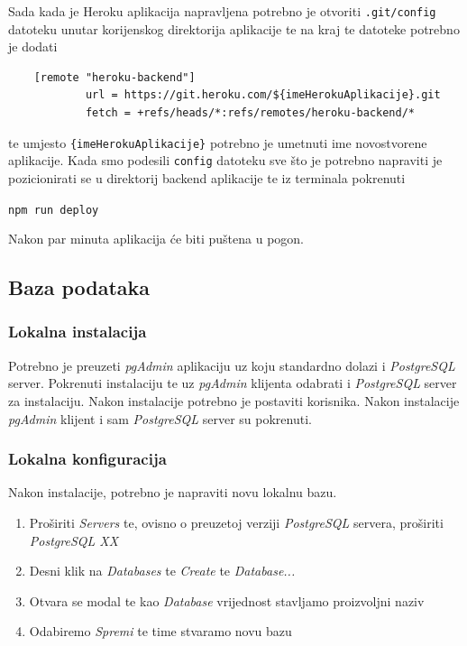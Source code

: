 		        		Sada kada je Heroku aplikacija napravljena potrebno je otvoriti \texttt{.git/config} datoteku unutar korijenskog direktorija aplikacije te na kraj te datoteke potrebno je dodati

                \begin{verbatim}
    [remote "heroku-backend"]
        	url = https://git.heroku.com/${imeHerokuAplikacije}.git
        	fetch = +refs/heads/*:refs/remotes/heroku-backend/*
								\end{verbatim}
								
								te umjesto \texttt{\{imeHerokuAplikacije\}} potrebno je umetnuti ime novostvorene aplikacije. Kada smo podesili \texttt{config} datoteku sve što je potrebno napraviti je pozicionirati se u direktorij backend aplikacije te iz terminala pokrenuti 

								\begin{center}
										\texttt{npm run deploy}
								\end{center}
								
								Nakon par minuta aplikacija će biti puštena u pogon.
						
						\pagebreak
		    
				\subsection{Baza podataka}
			
						\subsubsection*{Lokalna instalacija}
						
								Potrebno je preuzeti \textit{pgAdmin} aplikaciju uz koju standardno dolazi i \textit{PostgreSQL} server. Pokrenuti instalaciju te uz \textit{pgAdmin} klijenta odabrati i \textit{PostgreSQL} server za instalaciju. Nakon instalacije potrebno je postaviti korisnika. Nakon instalacije \textit{pgAdmin} klijent i sam \textit{PostgreSQL} server su pokrenuti.
								
						\subsubsection*{Lokalna konfiguracija}
								
								Nakon instalacije, potrebno je napraviti novu lokalnu bazu.
								
								\begin{enumerate}
										\item Proširiti \textit{Servers} te, ovisno o preuzetoj verziji \textit{PostgreSQL} servera, proširiti  \textit{PostgreSQL XX}
										\item Desni klik na \textit{Databases} te \textit{Create} te \textit{Database...}
										\item Otvara se modal te kao \textit{Database} vrijednost stavljamo proizvoljni naziv
										\item Odabiremo \textit{Spremi} te time stvaramo novu bazu
								\end{enumerate}
								
